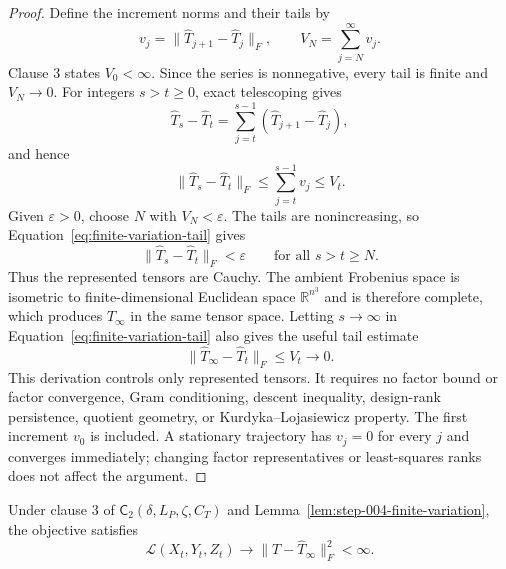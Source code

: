 \begin{proof}
Define the increment norms and their tails by
\[
v_j=\|\widehat T_{j+1}-\widehat T_j\|_F,
\qquad
V_N=\sum_{j=N}^{\infty}v_j.
\]
Clause 3 states $V_0<\infty$.  Since the series is nonnegative, every tail
is finite and $V_N\to0$.  For integers $s>t\geq0$, exact telescoping gives
\[
\widehat T_s-\widehat T_t
=\sum_{j=t}^{s-1}(\widehat T_{j+1}-\widehat T_j),
\]
and hence
\begin{equation}
\|\widehat T_s-\widehat T_t\|_F
\leq\sum_{j=t}^{s-1}v_j
\leq V_t.
\label{eq:finite-variation-tail}
\end{equation}
Given $\varepsilon>0$, choose $N$ with $V_N<\varepsilon$.  The tails are
nonincreasing, so Equation~\eqref{eq:finite-variation-tail} gives
\[
\|\widehat T_s-\widehat T_t\|_F<\varepsilon
\qquad\text{for all }s>t\geq N.
\]
Thus the represented tensors are Cauchy.  The ambient Frobenius space is
isometric to finite-dimensional Euclidean space $\mathbb R^{n^3}$ and is
therefore complete, which produces $\widehat T_\infty$ in the same tensor
space.  Letting $s\to\infty$ in
Equation~\eqref{eq:finite-variation-tail} also gives the useful tail estimate
\[
\|\widehat T_\infty-\widehat T_t\|_F\leq V_t\longrightarrow0.
\]
This derivation controls only represented tensors.  It requires no factor
bound or factor convergence, Gram conditioning, descent inequality,
design-rank persistence, quotient geometry, or Kurdyka--Lojasiewicz
property.  The first increment $v_0$ is included.  A stationary trajectory
has $v_j=0$ for every $j$ and converges immediately; changing factor
representatives or least-squares ranks does not affect the argument.
\end{proof}

\begin{proposition}
\label{prop:step-004-objective-limit}
Under clause 3 of $\mathsf C_2(\delta,L_P,\zeta,C_T)$ and
Lemma~\ref{lem:step-004-finite-variation}, the objective satisfies
\[
\mathcal L(X_t,Y_t,Z_t)
\longrightarrow
\|T-\widehat T_\infty\|_F^2<\infty.
\]
\end{proposition}

